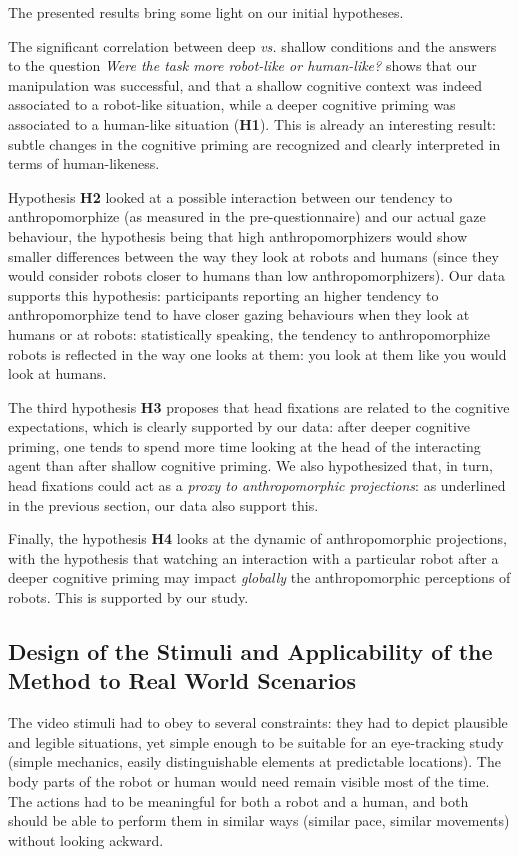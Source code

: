 \documentclass[lettersize, noapacite, twoside, HRI]{apa_HRI}
\newcommand{\vs}{\textit{vs.}\xspace}
\newcommand{\h}[1]{\textbf{H#1}\xspace}
\begin{document}
The presented results bring some light on our initial hypotheses.

The significant correlation between deep \vs shallow conditions and the
answers to the question \emph{Were the task more robot-like or human-like?}
shows that our manipulation was successful, and that a shallow cognitive
context was indeed associated to a robot-like situation, while a deeper
cognitive priming was associated to a human-like situation (\h{1}). This is
already an interesting result: subtle changes in the cognitive priming are
recognized and clearly interpreted in terms of human-likeness.

Hypothesis \h{2} looked at a possible interaction between our tendency to
anthropomorphize (as measured in the pre-questionnaire) and our actual gaze
behaviour, the hypothesis being that high anthropomorphizers would show smaller
differences between the way they look at robots and humans (since they would
consider robots closer to humans than low anthropomorphizers). Our data supports
this hypothesis: participants reporting an higher tendency to anthropomorphize
tend to have closer gazing behaviours when they look at humans or at robots:
statistically speaking, the tendency to anthropomorphize robots
is reflected in the way one looks at them: you look at them
like you would look at humans.

The third hypothesis \h{3} proposes that head fixations are related to the
cognitive expectations, which is clearly supported by our data: after deeper cognitive
priming, one tends to spend more time looking at the head of the interacting
agent than after shallow cognitive priming. We also hypothesized that, in turn,
head fixations could act as a \emph{proxy to anthropomorphic projections}: as
underlined in the previous section, our data also support this.

Finally, the hypothesis \h{4} looks at the dynamic of anthropomorphic
projections, with the hypothesis that watching an interaction with a particular
robot after a deeper cognitive priming may impact \emph{globally} the
anthropomorphic perceptions of robots. This is supported by our study.

\subsection{Design of the Stimuli and Applicability of the Method to Real World
Scenarios}
\label{stimuli_design}

The video stimuli had to obey to several constraints: they had to depict
plausible and legible situations, yet simple enough to be suitable for an
eye-tracking study (simple mechanics, easily distinguishable elements at
predictable locations). The body parts of the robot or human would need remain
visible most of the time. The actions had to be meaningful for both a robot and
a human, and both should be able to perform them in similar ways (similar pace,
similar movements) without looking ackward.
\end{document}
